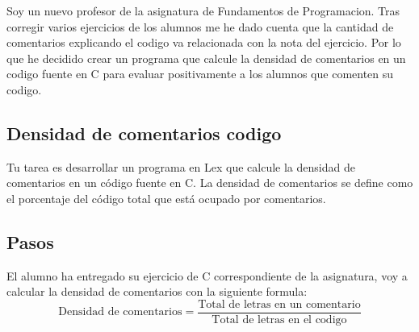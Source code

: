 \documentclass{article}
\begin{document}
        Soy un nuevo profesor de la asignatura de Fundamentos de Programacion. Tras corregir varios ejercicios de los alumnos me he dado cuenta que la cantidad de comentarios explicando 
        el codigo va relacionada con la nota del ejercicio. Por lo que he decidido crear un programa que calcule la densidad de comentarios en un codigo fuente en C para evaluar positivamente a los alumnos que comenten su codigo.
    
        \subsection{Densidad de comentarios codigo}
        Tu tarea es desarrollar un programa en Lex que calcule la densidad de comentarios en un código fuente en C. 
        La densidad de comentarios se define como el porcentaje del código total que está ocupado por comentarios. 

        \subsection{Pasos}
        El alumno ha entregado su ejercicio de C correspondiente de la asignatura, voy a calcular la densidad de comentarios con la siguiente formula: 
        \[ \text{{Densidad de comentarios}} = \frac{{\text{{Total de letras en un comentario}}}}{{\text{{Total de letras en el codigo}}}} \]
        
\end{document}
